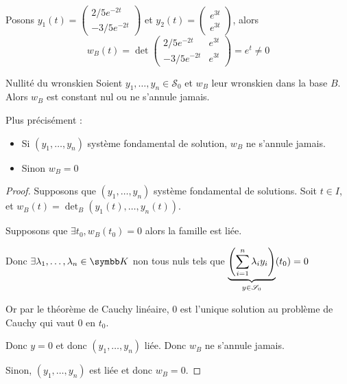 \begin{exemple}
    Posons $y_1(t) = \begin{pmatrix}
        2/5 e^{-2t} \\ -3/5 e^{-2t}
    \end{pmatrix}$ et $y_2(t) = \begin{pmatrix}
        e^{3t} \\ e^{3t}
    \end{pmatrix}$, alors 
    $$w_B(t) = \det \begin{pmatrix}
        2/5 e^{-2t} & e^{3t} \\
        -3/5 e^{-2t} & e^{3t}
    \end{pmatrix} = e^{t} \neq 0$$
\end{exemple}

\begin{theoreme}{Nullité du wronskien}{}
    Soient $y_1, \dots, y_n \in \mathscr S_0$ et $w_B$ leur wronskien dans la base $B$. Alors 
    $w_B$ est constant nul ou ne s'annule jamais. 

    Plus précisément : 
    \begin{itemize}
        \item Si $(y_1, \dots, y_n)$ système fondamental de solution, $w_B$ ne s'annule jamais. 
        \item Sinon $w_B = 0$
    \end{itemize}
\end{theoreme}


\begin{proof}
    Supposons que $(y_1, \dots, y_n)$ système fondamental de solutions. Soit $t \in I$, 
    et $w_B(t) = \det_B (y_1(t), \dots, y_n(t))$.

    Supposons que $\exists t_0, w_B(t_0) = 0$ alors la famille est liée. 

    Donc $\exists \lambda_1, \dots, \lambda_n \in \K$ non tous nuls tels que
    $\displaystyle\underbrace{ \left( \sum_{i = 1}^{n} \lambda_i y_i \right)}_{y \in \mathscr S_0} (t_0) = 0$

    Or par le théorème de Cauchy linéaire, $0$ est l'unique solution au problème de Cauchy
    qui vaut $0$ en $t_0$. 

    Donc $y = 0$ et donc $(y_1, \dots, y_n)$ liée. Donc $w_B$ ne s'annule jamais.

    Sinon, $(y_1, \dots, y_n)$ est liée et donc $w_B = 0$.
\end{proof}


